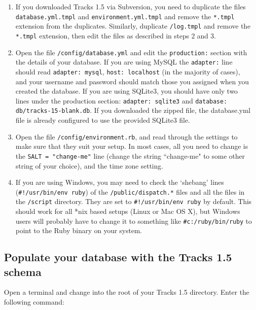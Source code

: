 \documentclass[10pt,twoside]{memoir}
\begin{document}
\begin{enumerate}


\item If you downloaded Tracks 1.5 via Subversion, you need to duplicate the files \texttt{database.yml.tmpl} and \texttt{environment.yml.tmpl} and remove the \texttt{*.tmpl} extension from the duplicates. Similarly, duplicate \texttt{/log.tmpl} and remove the \texttt{*.tmpl} extension, then edit the files as described in steps 2 and 3.

\item Open the file \texttt{/config/database.yml} and edit the \texttt{production:} section with the details of your database. If you are using MySQL the \texttt{adapter:} line should read \texttt{adapter: mysql}, \texttt{host: localhost} (in the majority of cases), and your username and password should match those you assigned when you created the database. If you are using SQLite3, you should have only two lines under the production section: \texttt{adapter: sqlite3} and \texttt{database: db/tracks-15-blank.db}. If you downloaded the zipped file, the database.yml file is already configured to use the provided SQLite3 file.

\item Open the file \texttt{/config/environment.rb}, and read through the settings to make sure that they suit your setup. In most cases, all you need to change is the \texttt{SALT = "change-me"} line (change the string ``change-me" to some other string of your choice), and the time zone setting.

\item If you are using Windows, you may need to check the `shebang' lines (\texttt{\#!/usr/bin/env ruby}) of the \texttt{/public/dispatch.*} files and all the files in the \texttt{/script} directory. They are set to \texttt{\#!/usr/bin/env ruby} by default. This should work for all *nix based setups (Linux or Mac OS X), but Windows users will probably have to change it to something like \texttt{\#c:/ruby/bin/ruby} to point to the Ruby binary on your system.
\end{enumerate}

\subsection{Populate your database with the Tracks 1.5 schema}
\label{rake_install}

Open a terminal and change into the root of your Tracks 1.5 directory. Enter the following command:
\end{document}
